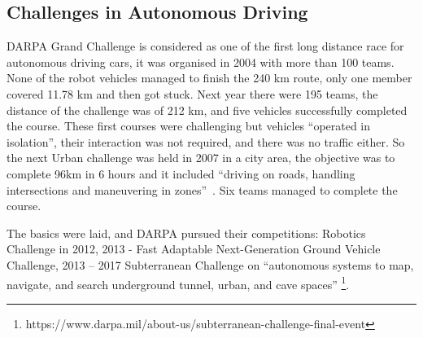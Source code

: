 \documentclass[twoside,11pt]{article}
\begin{document}
\subsection{Challenges in Autonomous Driving}
DARPA Grand Challenge is considered as one of the first long distance race for autonomous driving cars, it was organised in 2004 with more than 100 teams. None of the robot vehicles managed to finish the 240 km route, only one member covered 11.78 km and then got stuck. Next year there were 195 teams, the distance of the challenge was of 212 km, and five vehicles successfully completed the course. These first courses were challenging but vehicles “operated in isolation”, their interaction was not required, and there was no traffic either. So the next Urban challenge was held in 2007 in a city area, the objective was to complete 96km in 6 hours and it included “driving on roads, handling intersections and maneuvering in zones”~\citep{DarpaTartanTeam}. Six teams managed to complete the course. 

The basics were laid, and DARPA pursued their competitions: Robotics Challenge in 2012, 2013 - Fast Adaptable Next-Generation Ground Vehicle Challenge, 2013 – 2017 Subterranean Challenge on “autonomous systems to map, navigate, and search underground tunnel, urban, and cave spaces” \footnote{https://www.darpa.mil/about-us/subterranean-challenge-final-event}.
\end{document}
